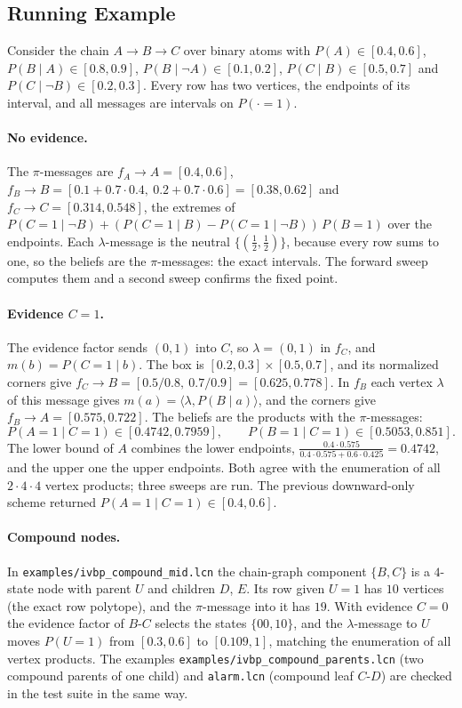 \documentclass{article} %
\begin{document}
\subsection{Running Example}

Consider the chain $A\to B\to C$ over binary atoms with
$P(A)\in[0.4,0.6]$, $P(B\mid A)\in[0.8,0.9]$, $P(B\mid\lnot A)\in[0.1,0.2]$,
$P(C\mid B)\in[0.5,0.7]$ and $P(C\mid\lnot B)\in[0.2,0.3]$. Every row has two vertices,
the endpoints of its interval, and all messages are intervals on $P(\cdot{=}1)$.

\paragraph{No evidence.}
The $\pi$-messages are
$f_A\to A=[0.4,0.6]$, $f_B\to B=[0.1+0.7\cdot0.4,\ 0.2+0.7\cdot0.6]=[0.38,0.62]$ and
$f_C\to C=[0.314,0.548]$, the extremes of
$P(C{=}1\mid\lnot B)+(P(C{=}1\mid B)-P(C{=}1\mid\lnot B))\,P(B{=}1)$ over the
endpoints. Each $\lambda$-message is the neutral $\{(\tfrac12,\tfrac12)\}$, because
every row sums to one, so the beliefs are the $\pi$-messages: the exact intervals. The
forward sweep computes them and a second sweep confirms the fixed point.

\paragraph{Evidence $C{=}1$.}
The evidence factor sends $(0,1)$ into $C$, so $\lambda=(0,1)$ in $f_C$, and
$m(b)=P(C{=}1\mid b)$. The box is $[0.2,0.3]\times[0.5,0.7]$, and its normalized
corners give $f_C\to B=[0.5/0.8,\ 0.7/0.9]=[0.625,0.778]$. In $f_B$ each vertex
$\lambda$ of this message gives $m(a)=\langle\lambda,P(B\mid a)\rangle$, and the
corners give $f_B\to A=[0.575,0.722]$. The beliefs are the products with the
$\pi$-messages:
\[
  P(A{=}1\mid C{=}1)\in[0.4742,0.7959],\qquad P(B{=}1\mid C{=}1)\in[0.5053,0.851].
\]
The lower bound of $A$ combines the lower endpoints,
$\frac{0.4\cdot0.575}{0.4\cdot0.575+0.6\cdot0.425}=0.4742$, and the upper one the
upper endpoints. Both agree with the enumeration of all $2\cdot4\cdot4$ vertex
products; three sweeps are run. The previous downward-only scheme returned
$P(A{=}1\mid C{=}1)\in[0.4,0.6]$.

\paragraph{Compound nodes.}
In \texttt{examples/ivbp\_compound\_mid.lcn} the chain-graph component $\{B,C\}$ is
a $4$-state node with parent $U$ and children $D$, $E$. Its row given $U{=}1$
has $10$ vertices (the exact row polytope), and the $\pi$-message into it has $19$. With
evidence $C{=}0$ the evidence factor of $B\text{-}C$ selects the states $\{00,10\}$, and the
$\lambda$-message to $U$ moves $P(U{=}1)$ from $[0.3,0.6]$ to $[0.109,1]$, matching
the enumeration of all vertex products. The examples
\texttt{examples/ivbp\_compound\_parents.lcn} (two compound parents of one child) and
\texttt{alarm.lcn} (compound leaf $C\text{-}D$) are checked in the test suite in the
same way.
\end{document}
